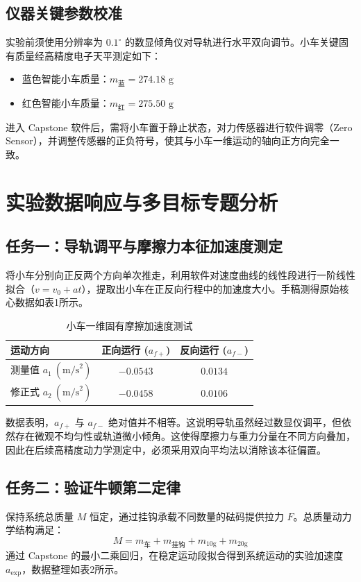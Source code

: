 \documentclass[twocolumn,zihao=5,a4paper]{ctexart} %
\begin{document}
	\subsection{仪器关键参数校准}
	实验前须使用分辨率为 $0.1^\circ$ 的数显倾角仪对导轨进行水平双向调节。小车关键固有质量经高精度电子天平测定如下：
	\begin{itemize}
		\item 蓝色智能小车质量：$m_{\text{蓝}} = 274.18\text{ g}$
		\item 红色智能小车质量：$m_{\text{红}} = 275.50\text{ g}$
	\end{itemize}
	进入 Capstone 软件后，需将小车置于静止状态，对力传感器进行软件调零（Zero Sensor），并调整传感器的正负符号，使其与小车一维运动的轴向正方向完全一致。
	
	\section{实验数据响应与多目标专题分析}
	
	\subsection{任务一：导轨调平与摩擦力本征加速度测定}
	将小车分别向正反两个方向单次推走，利用软件对速度曲线的线性段进行一阶线性拟合（$v = v_0 + at$），提取出小车在正反向行程中的加速度大小。手稿测得原始核心数据如表1所示。
	
	\begin{table}[H]
		\centering
		\caption{小车一维固有摩擦加速度测试}
		\begin{tabular}{lcc}
			\toprule
			运动方向 & 正向运行 ($a_{f+}$) & 反向运行 ($a_{f-}$) \\
			\midrule
			测量值 $a_1\ (\text{m/s}^2)$ & $-0.0543$ & $0.0134$ \\
			修正式 $a_2\ (\text{m/s}^2)$ & $-0.0458$ & $0.0106$ \\
			\bottomrule
		\end{tabular}
	\end{table}
	
	数据表明，$a_{f+}$ 与 $a_{f-}$ 绝对值并不相等。这说明导轨虽然经过数显仪调平，但依然存在微观不均匀性或轨道微小倾角。这使得摩擦力与重力分量在不同方向叠加，因此在后续高精度动力学测定中，必须采用双向平均法以消除该本征偏置。
	
	\subsection{任务二：验证牛顿第二定律}
	保持系统总质量 $M$ 恒定，通过挂钩承载不同数量的砝码提供拉力 $F$。总质量动力学结构满足：
	\begin{equation}
		M = m_{\text{车}} + m_{\text{挂钩}} + m_{10\text{g}} + m_{20\text{g}}
	\end{equation}
	通过 Capstone 的最小二乘回归，在稳定运动段拟合得到系统运动的实验加速度 $a_{\text{exp}}$，数据整理如表2所示。
	
\end{document}
